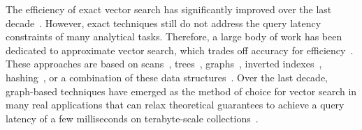 

The efficiency of exact vector search has significantly improved over the last decade~\cite{hydra1, isaxfamily, dumpy, sing, oddysey}. 
However, exact techniques still do not address the query latency constraints of many analytical tasks. Therefore, 
a large body of work has been dedicated to approximate vector search, which trades off accuracy for efficiency~\cite{lernaeanhydra2,dpg,DBLP:journals/debu/00070P023}. These approaches are based on scans~\cite{vafile,va+file}, trees~\cite{conf/vldb/Wang2013,isax2+,parisplus,coconut,localpairbundle,dpisax,ulisse,messi,flann,hdindex,seanet,wang2024dumpyos,leafi}, graphs~\cite{hnsw,nsg,vamana,hcnng, efanna,SPTAG2}, inverted indexes~\cite{gist,conf/icassp/jegou2011,journal/iccv/xia2013,journal/pami/babenko15}, hashing~\cite{conf/stoc/indyk1998,conf/vldb/sun14,srs}, or a combination of these data structures~\cite{ieh,efanna,SPTAG4,hcnng,elpis,lshapg,DBLP:journals/pvldb/WeiPLP24}. Over the last decade, graph-based techniques have emerged as the method of choice for vector search in many real applications that can relax theoretical guarantees to achieve a query latency of a few milliseconds on terabyte-scale collections~\cite{graphrec2,graphrec1,alibabaknngml,faiss}. 

